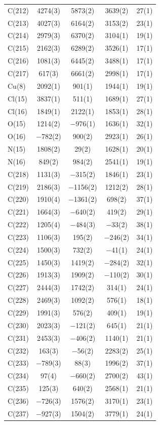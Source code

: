 \begin{center}
{\begin{supertabular}{lcccc}
C(212)&4274(3)&5873(2)&3639(2)&27(1)\\
C(213)&4027(3)&6164(2)&3153(2)&23(1)\\
C(214)&2979(3)&6370(2)&3104(1)&19(1)\\
C(215)&2162(3)&6289(2)&3526(1)&17(1)\\
C(216)&1081(3)&6445(2)&3488(1)&17(1)\\
C(217)&617(3)&6661(2)&2998(1)&17(1)\\
Cu(8)&2092(1)&901(1)&1944(1)&19(1)\\
Cl(15)&3837(1)&511(1)&1689(1)&27(1)\\
Cl(16)&1849(1)&2122(1)&1853(1)&28(1)\\
O(15)&1214(2)&$-$976(1)&1636(1)&32(1)\\
O(16)&$-$782(2)&900(2)&2923(1)&26(1)\\
N(15)&1808(2)&29(2)&1628(1)&20(1)\\
N(16)&849(2)&984(2)&2541(1)&19(1)\\
C(218)&1131(3)&$-$315(2)&1846(1)&23(1)\\
C(219)&2186(3)&$-$1156(2)&1212(2)&28(1)\\
C(220)&1910(4)&$-$1361(2)&698(2)&37(1)\\
C(221)&1664(3)&$-$640(2)&419(2)&29(1)\\
C(222)&1205(4)&$-$484(3)&$-$33(2)&38(1)\\
C(223)&1106(3)&195(2)&$-$246(2)&34(1)\\
C(224)&1500(3)&732(2)&$-$41(1)&24(1)\\
C(225)&1450(3)&1419(2)&$-$284(2)&32(1)\\
C(226)&1913(3)&1909(2)&$-$110(2)&30(1)\\
C(227)&2444(3)&1742(2)&314(1)&24(1)\\
C(228)&2469(3)&1092(2)&576(1)&18(1)\\
C(229)&1991(3)&576(2)&409(1)&19(1)\\
C(230)&2023(3)&$-$121(2)&645(1)&21(1)\\
C(231)&2453(3)&$-$406(2)&1140(1)&21(1)\\
C(232)&163(3)&$-$56(2)&2283(2)&25(1)\\
C(233)&$-$789(3)&88(3)&1996(2)&37(1)\\
C(234)&97(4)&$-$660(2)&2700(2)&43(1)\\
C(235)&125(3)&640(2)&2568(1)&21(1)\\
C(236)&$-$726(3)&1576(2)&3170(1)&23(1)\\
C(237)&$-$927(3)&1504(2)&3779(1)&24(1)\\

\end{supertabular}}
\end{center}

